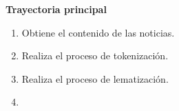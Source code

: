 

\begin{large}
	\textbf{Trayectoria principal}\\
\end{large}	

\begin{enumerate}[1.]

	
	\item \sistema Obtiene el contenido de las noticias.

	\item \sistema Realiza el proceso de tokenización.

	\item \sistema Realiza el proceso de lematización.
	
	\item \finCU	

\end{enumerate}

  